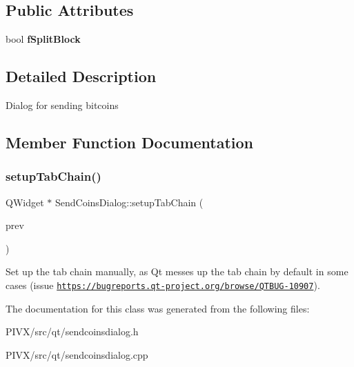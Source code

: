 \subsection*{Public Attributes}
\begin{DoxyCompactItemize}
\item 
\mbox{\label{class_send_coins_dialog_aed1a37c023b2546607356f83874c0721}} 
bool {\bfseries f\+Split\+Block}
\end{DoxyCompactItemize}


\subsection{Detailed Description}
Dialog for sending bitcoins 

\subsection{Member Function Documentation}
\mbox{\label{class_send_coins_dialog_a689658987f2af0896f25bf37bb945d91}} 
\subsubsection{\texorpdfstring{setup\+Tab\+Chain()}{setupTabChain()}}
{\footnotesize\ttfamily Q\+Widget $\ast$ Send\+Coins\+Dialog\+::setup\+Tab\+Chain (\begin{DoxyParamCaption}\item[{Q\+Widget $\ast$}]{prev }\end{DoxyParamCaption})}

Set up the tab chain manually, as Qt messes up the tab chain by default in some cases (issue \href{https://bugreports.qt-project.org/browse/QTBUG-10907}{\tt https\+://bugreports.\+qt-\/project.\+org/browse/\+Q\+T\+B\+U\+G-\/10907}). 

The documentation for this class was generated from the following files\+:\begin{DoxyCompactItemize}
\item 
P\+I\+V\+X/src/qt/sendcoinsdialog.\+h\item 
P\+I\+V\+X/src/qt/sendcoinsdialog.\+cpp\end{DoxyCompactItemize}
